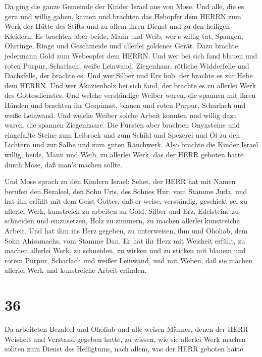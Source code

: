  Da ging die ganze Gemeinde der Kinder Israel aus von Mose.
 Und alle, die es gern und willig gaben, kamen und brachten
das Hebopfer dem HERRN zum Werk der Hütte des Stifts und zu allem ihren
Dienst und zu den heiligen Kleidern.  Es brachten aber
beide, Mann und Weib, wer's willig tat, Spangen, Ohrringe, Ringe und
Geschmeide und allerlei goldenes Gerät. Dazu brachte jedermann Gold zum
Webeopfer dem HERRN.  Und wer bei sich fand blauen und
roten Purpur, Scharlach, weiße Leinwand, Ziegenhaar, rötliche
Widderfelle und Dachsfelle, der brachte es.  Und wer Silber
und Erz hob, der brachte es zur Hebe dem HERRN. Und wer Akazienholz bei
sich fand, der brachte es zu allerlei Werk des Gottesdienstes.
 Und welche verständige Weiber waren, die spannen mit ihren
Händen und brachten ihr Gespinnst, blauen und roten Purpur, Scharlach
und weiße Leinwand.  Und welche Weiber solche Arbeit
konnten und willig dazu waren, die spannen Ziegenhaare. 
Die Fürsten aber brachten Onyxsteine und eingefaßte Steine zum Leibrock
und zum Schild  und Spezerei und Öl zu den Lichtern und zur
Salbe und zum guten Räuchwerk.  Also brachte die Kinder
Israel willig, beide, Mann und Weib, zu allerlei Werk, das der HERR
geboten hatte durch Mose, daß man's machen sollte.

 Und Mose sprach zu den Kindern Israel: Sehet, der HERR hat
mit Namen berufen den Bezaleel, den Sohn Uris, des Sohnes Hur, vom
Stamme Juda,  und hat ihn erfüllt mit dem Geist Gottes, daß
er weise, verständig, geschickt sei zu allerlei Werk, 
kunstreich zu arbeiten an Gold, Silber und Erz,  Edelsteine
zu schneiden und einzusetzen, Holz zu zimmern, zu machen allerlei
kunstreiche Arbeit.  Und hat ihm ins Herz gegeben, zu
unterweisen, ihm und Oholiab, dem Sohn Ahisamachs, vom Stamme Dan.
 Er hat ihr Herz mit Weisheit erfüllt, zu machen allerlei
Werk, zu schneiden, zu wirken und zu sticken mit blauem und rotem
Purpur, Scharlach und weißer Leinwand, und mit Weben, daß sie machen
allerlei Werk und kunstreiche Arbeit erfinden.

\hypertarget{section-35}{%
\section{36}\label{section-35}}

 Da arbeiteten Bezaleel und Oholiab und alle weisen Männer,
denen der HERR Weisheit und Verstand gegeben hatte, zu wissen, wie sie
allerlei Werk machen sollten zum Dienst des Heiligtums, nach allem, was
der HERR geboten hatte.

